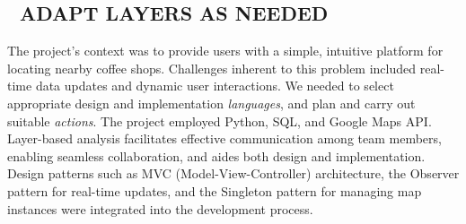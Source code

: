 \subsection*{💎 ADAPT LAYERS AS NEEDED {\hfill \cognitive}}
The project's context was to provide users with a simple, intuitive
platform for locating nearby coffee shops. Challenges inherent to this
problem included real-time data updates and dynamic user interactions.
We needed to select appropriate design and implementation
\emph{languages}, and plan and carry out suitable \emph{actions}.
The project employed Python, SQL, and Google Maps API. Layer-based
analysis facilitates effective communication among team members,
enabling seamless collaboration, and aides both design and
implementation.
Design patterns such
as {\scitshape MVC (Model-View-Controller) architecture}, the
{\scitshape Observer} pattern for real-time updates, and the
{\scitshape Singleton} pattern for managing map instances were
integrated into the development process.
